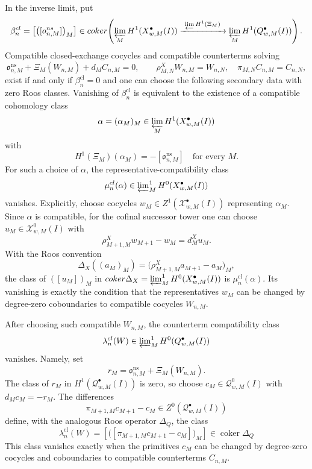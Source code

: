 \begin{thm}
  In the inverse limit, put
  \[
    \beta^{\mathrm{cl}}_n
      =
      \left[\bigl([\mathfrak o^{\mathrm{ns}}_{n,M}]\bigr)_M\right]
      \in
      \operatorname{coker}\!\left(
        \varprojlim_M H^1(\mathcal X^\bullet_{w,M}(I))
        \xrightarrow{\ \varprojlim H^1(\Xi_M)\ }
        \varprojlim_M H^1(\mathcal Q^\bullet_{w,M}(I))
      \right).
  \]
  Compatible closed-exchange cocycles and compatible counterterms solving
  \[
    \mathfrak o^{\mathrm{ns}}_{n,M}
      +\Xi_M(W_{n,M})+d_M C_{n,M}=0,\qquad
    \rho^X_{M,N}W_{n,M}=W_{n,N},\quad
    \pi_{M,N}C_{n,M}=C_{n,N},
  \]
  exist if and only if \(\beta^{\mathrm{cl}}_n=0\) and one can choose the
  following secondary data with zero Roos classes.  Vanishing of
  \(\beta^{\mathrm{cl}}_n\) is equivalent to the existence of a compatible
  cohomology class
  \[
    \alpha=(\alpha_M)_M
      \in\varprojlim_M H^1(\mathcal X^\bullet_{w,M}(I))
  \]
  with
  \[
    H^1(\Xi_M)(\alpha_M)
      =-[\mathfrak o^{\mathrm{ns}}_{n,M}]
      \quad\text{for every }M.
  \]
  For such a choice of \(\alpha\), the representative-compatibility class
  \[
    \mu^{\mathrm{cl}}_n(\alpha)
      \in
      \varprojlim\nolimits^1_M
      H^0(\mathcal X^\bullet_{w,M}(I))
  \]
  vanishes.  Explicitly, choose cocycles
  \(w_M\in Z^1(\mathcal X^\bullet_{w,M}(I))\) representing \(\alpha_M\).
  Since \(\alpha\) is compatible, for the cofinal successor tower one can
  choose \(u_M\in\mathcal X^0_{w,M}(I)\) with
  \[
    \rho^X_{M+1,M}w_{M+1}-w_M=d^X_M u_M.
  \]
  With the Roos convention
  \[
    \Delta_X((a_M)_M)
      =
      \bigl(\rho^X_{M+1,M}a_{M+1}-a_M\bigr)_M,
  \]
  the class of \(( [u_M] )_M\) in
  \(\operatorname{coker}\Delta_X
  =\varprojlim\nolimits^1_M H^0(\mathcal X^\bullet_{w,M}(I))\)
  is \(\mu^{\mathrm{cl}}_n(\alpha)\).  Its vanishing is exactly the
  condition that the representatives \(w_M\) can be changed by
  degree-zero coboundaries to compatible cocycles \(W_{n,M}\).

  After choosing such compatible \(W_{n,M}\), the counterterm
  compatibility class
  \[
    \lambda^{\mathrm{cl}}_n(W)
      \in
      \varprojlim\nolimits^1_M
      H^0(\mathcal Q^\bullet_{w,M}(I))
  \]
  vanishes.  Namely, set
  \[
    r_M=\mathfrak o^{\mathrm{ns}}_{n,M}+\Xi_M(W_{n,M}).
  \]
  The class of \(r_M\) in \(H^1(\mathcal Q^\bullet_{w,M}(I))\) is zero,
  so choose \(c_M\in\mathcal Q^0_{w,M}(I)\) with \(d_M c_M=-r_M\).  The
  differences
  \[
    \pi_{M+1,M}c_{M+1}-c_M
      \in Z^0(\mathcal Q^\bullet_{w,M}(I))
  \]
  define, with the analogous Roos operator \(\Delta_Q\), the class
  \[
    \lambda^{\mathrm{cl}}_n(W)
      =
      \left[\bigl(
      [\pi_{M+1,M}c_{M+1}-c_M]\bigr)_M\right]
      \in\operatorname{coker}\Delta_Q
  \]
  This class vanishes exactly when the primitives \(c_M\) can be changed by
  degree-zero cocycles and coboundaries to compatible counterterms
  \(C_{n,M}\).


\end{thm}
